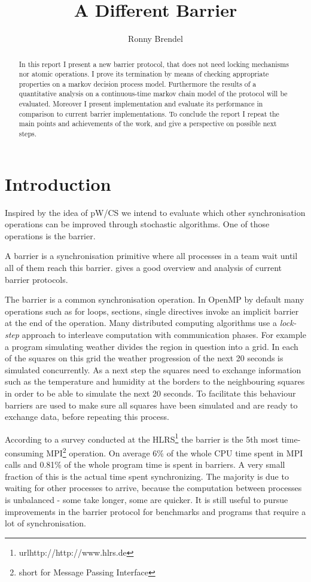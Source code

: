\documentclass[a4paper, 10pt]{article}
\title{A Different Barrier}
\author{Ronny Brendel}
\begin{document}
\maketitle

\begin{abstract}
	In this report I present a new barrier protocol, that does not need locking mechanisms nor atomic operations. I prove its termination by means of checking appropriate properties on a markov decision process model. Furthermore the results of a quantitative analysis on a continuous-time markov chain model of the protocol will be evaluated. Moreover I present implementation and evaluate its performance in comparison to current barrier implementations. To conclude the report I repeat the main points and achievements of the work, and give a perspective on possible next steps.
\end{abstract}

\section{Introduction}
Inspired by the idea of pW/CS\cite{pwcs} we intend to evaluate which other synchronisation operations can be improved through stochastic algorithms. One of those operations is the barrier.

A barrier is a synchronisation primitive where all processes in a team wait until all of them reach this barrier. \cite{hoefler2005} gives a good overview and analysis of current barrier protocols.

The barrier is a common synchronisation operation. In OpenMP\cite{omp} by default many operations such as for loops, sections, single directives invoke an implicit barrier at the end of the operation. Many distributed computing algorithms use a \emph{lock-step} approach to interleave computation with communication phases. For example a program simulating weather divides the region in question into a grid. In each of the squares on this grid the weather progression of the next 20 seconds is simulated concurrently. As a next step the squares need to exchange information such as the temperature and humidity at the borders to the neighbouring squares in order to be able to simulate the next 20 seconds. To facilitate this behaviour barriers are used to make sure all squares have been simulated and are ready to exchange data, before repeating this process.

According to a survey conducted at the HLRS\footnote{url{http://http://www.hlrs.de}}\cite{rab00} the barrier is the 5th most time-consuming MPI\footnote{short for Message Passing Interface}\cite{mpi} operation. On average 6\% of the whole CPU time spent in MPI calls and 0.81\% of the whole program time is spent in barriers. A very small fraction of this is the actual time spent synchronizing. The majority is due to waiting for other processes to arrive, because the computation between processes is unbalanced - some take longer, some are quicker. It is still useful to pursue improvements in the barrier protocol for benchmarks and programs that require a lot of synchronisation.
\end{document}
